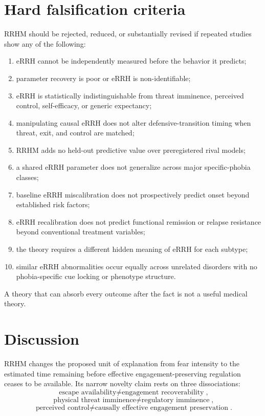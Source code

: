 \documentclass[9pt,twocolumn]{article}
\begin{document}
\section{Hard falsification criteria}
RRHM should be rejected, reduced, or substantially revised if repeated studies show any of the following:
\begin{enumerate}
\item eRRH cannot be independently measured before the behavior it predicts;
\item parameter recovery is poor or eRRH is non-identifiable;
\item eRRH is statistically indistinguishable from threat imminence, perceived control, self-efficacy, or generic expectancy;
\item manipulating causal eRRH does not alter defensive-transition timing when threat, exit, and control are matched;
\item RRHM adds no held-out predictive value over preregistered rival models;
\item a shared eRRH parameter does not generalize across major specific-phobia classes;
\item baseline eRRH miscalibration does not prospectively predict onset beyond established risk factors;
\item eRRH recalibration does not predict functional remission or relapse resistance beyond conventional treatment variables;
\item the theory requires a different hidden meaning of eRRH for each subtype;
\item similar eRRH abnormalities occur equally across unrelated disorders with no phobia-specific cue locking or phenotype structure.
\end{enumerate}

A theory that can absorb every outcome after the fact is not a useful medical theory.

\section{Discussion}
RRHM changes the proposed unit of explanation from fear intensity to the estimated time remaining before effective engagement-preserving regulation ceases to be available. Its narrow novelty claim rests on three dissociations:
\[
\boxed{\text{escape availability}\neq\text{engagement recoverability}},
\]
\[
\boxed{\text{physical threat imminence}\neq\text{regulatory imminence}},
\]
\[
\boxed{\text{perceived control}\neq\text{causally effective engagement preservation}}.
\]
\end{document}
